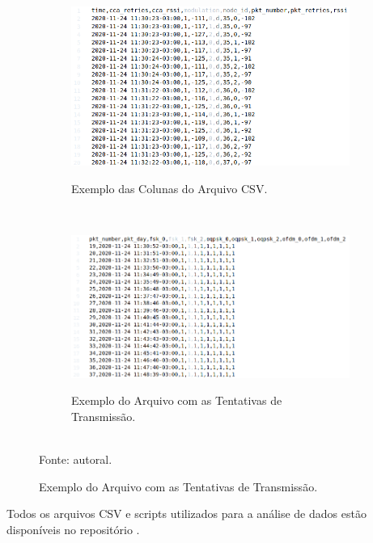 \begin{figure}[h]
      \centering
      \caption{Dados do experimento.}
      \begin{subfigure}{.8\textwidth}
            \centering
            \caption{Exemplo das Colunas do Arquivo CSV.}
            \includegraphics[width=\textwidth]{./sections/textual/chapters/images/csv_example.png}
            \label{fig:csv_example}
      \end{subfigure}
      \\
      \begin{subfigure}{.8\textwidth}
            \centering
            \caption{Exemplo do Arquivo com as Tentativas de Transmissão.}
            \includegraphics[width=\textwidth]{./sections/textual/chapters/images/second_csv_example.png}
            \label{fig:second_csv_example}
      \end{subfigure}
      \\Fonte: autoral.
      \label{fig:camposCSV}
\end{figure}

Todos os arquivos CSV e scripts utilizados para a análise de dados estão disponíveis no repositório \cite{wisun-traces}.

